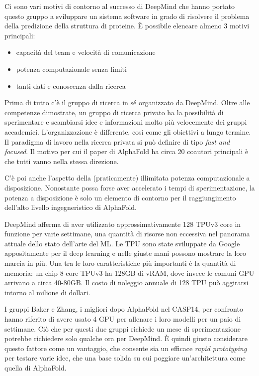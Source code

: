 {
Ci sono vari motivi di contorno al successo di DeepMind che hanno portato questo gruppo a sviluppare un sistema software in grado di risolvere il problema della predizione della struttura di proteine. È possibile elencare almeno 3 motivi principali:

\begin{itemize}
	\item capacità del team e velocità di comunicazione
	\item potenza computazionale senza limiti
	\item tanti dati e conoscenza dalla ricerca
\end{itemize}

Prima di tutto c'è il gruppo di ricerca in sé organizzato da DeepMind. Oltre alle competenze dimostrate, un gruppo di ricerca privato ha la possibilità di sperimentare e scambiarsi idee e informazioni molto più velocemente dei gruppi accademici. L'organizzazione è differente, così come gli obiettivi a lungo termine. Il paradigma di lavoro nella ricerca privata si può definire di tipo \textit{fast and focused}. Il motivo per cui il paper di AlphaFold ha circa 20 coautori principali è che tutti vanno nella stessa direzione.

\par C'è poi anche l'aspetto della (praticamente) illimitata potenza computazionale a disposizione. Nonostante possa forse aver accelerato i tempi di sperimentazione, la potenza a disposizione è solo un elemento di contorno per il raggiungimento dell'alto livello ingegneristico di AlphaFold.

\par DeepMind afferma di aver utilizzato approssimativamente 128 TPUv3 core in funzione per varie settimane, una quantità di risorse non eccessiva nel panorama attuale dello stato dell'arte del ML. Le TPU sono state sviluppate da Google appositamente per il deep learning e nelle giuste mani possono mostrare la loro marcia in più. Una tra le loro caratteristiche più importanti è la quantità di memoria: un chip 8-core TPUv3 ha 128GB di vRAM, dove invece le comuni GPU arrivano a circa 40-80GB. Il costo di noleggio annuale di 128 TPU può aggirarsi intorno al milione di dollari\supercite{blopigAF}.

\par I gruppi Baker e Zhang, i migliori dopo AlphaFold nel CASP14, per confronto hanno riferito di avere usato 4 GPU per allenare i loro modelli per un paio di settimane. Ciò che per questi due gruppi richiede un mese di sperimentazione potrebbe richiedere solo qualche ora per DeepMind. È quindi giusto considerare questo fattore come un vantaggio, che consente sia un efficace \textit{rapid prototyping} per testare varie idee, che una base solida su cui poggiare un'architettura come quella di AlphaFold.\\


}
